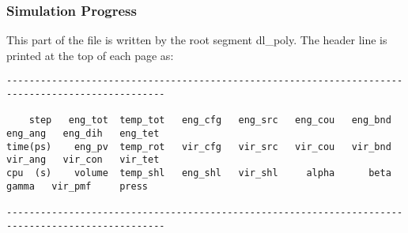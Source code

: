 \subsubsection{Simulation Progress}

This part of the file is written by the \D root segment
{\sc dl\_poly}.  The header line is printed at the top of each page as:

\begin{lstlisting}[basicstyle=\small]
--------------------------------------------------------------------------------------------------

    step   eng_tot  temp_tot   eng_cfg   eng_src   eng_cou   eng_bnd   eng_ang   eng_dih   eng_tet
time(ps)    eng_pv  temp_rot   vir_cfg   vir_src   vir_cou   vir_bnd   vir_ang   vir_con   vir_tet
cpu  (s)    volume  temp_shl   eng_shl   vir_shl     alpha      beta     gamma   vir_pmf     press

--------------------------------------------------------------------------------------------------
\end{lstlisting}

